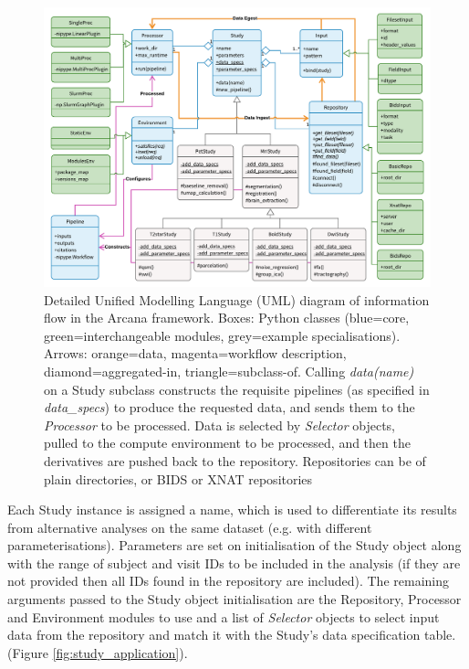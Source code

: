 \documentclass[smallextended]{svjour3}       %
\begin{document}
\begin{figure}
	\centering
    \includegraphics[width=\textwidth]{../figures/full_arcana_uml}
  \caption{Detailed Unified Modelling Language (UML) diagram of
information flow in the Arcana framework. Boxes: Python classes
(blue=core, green=interchangeable modules, grey=example
specialisations). Arrows: orange=data, magenta=workflow description,
diamond=aggregated-in, triangle=subclass-of. Calling \emph{data(name)}
on a Study subclass constructs the requisite pipelines (as specified in
\emph{data\_specs}) to produce the requested data, and sends them
to the \emph{Processor} to be processed. Data is selected by
\emph{Selector} objects, pulled to the compute environment to be
processed, and then the derivatives are pushed back to the repository.
Repositories can be of plain directories, or BIDS or XNAT repositories}
\label{fig:full_uml}
\end{figure}

Each Study instance is assigned a name, which is used to differentiate its
results from alternative analyses on the same dataset (e.g. with different
parameterisations). Parameters are set on initialisation of the Study object
along with the range of subject and visit IDs to be included in the analysis
(if they are not provided then all IDs found in the repository are included).
The remaining arguments passed to the Study object initialisation are the
Repository, Processor and Environment modules to use and a list of
\emph{Selector} objects to select input data from the repository and match
it with the Study's data specification table.
(Figure \ref{fig:study_application}).
\end{document}
